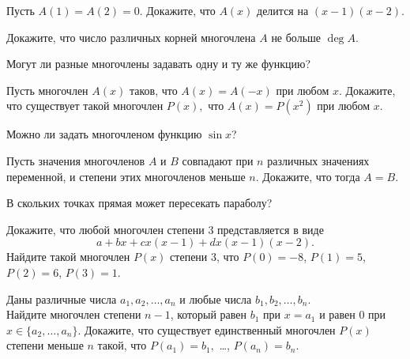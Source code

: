 \documentclass[a4paper, 12pt]{article}
\begin{document}
 Пусть $A(1)=A(2)=0.$  Докажите, что  $A(x)$ делится на $(x-1)(x-2).$

 Докажите, что число различных корней многочлена $A$ не больше
$\deg A.$

Могут ли разные многочлены задавать одну и ту же функцию?

 Пусть многочлен $A(x)$ таков, что $A(x)=A(-x)$ при любом $x$.
Докажите, что  существует такой многочлен $P(x),$ что
$A(x)=P(x^2)$ при любом $x$.


 Можно ли задать многочленом функцию $\sin x$?

 Пусть значения многочленов $A$ и $B$
совпадают при $n$ различных значениях переменной, и степени
этих многочленов меньше $n$. Докажите, что тогда $A=B.$

В скольких точках прямая может пересекать параболу?



  Докажите, что  любой многочлен степени 3
представляется в виде
$$a+bx+cx(x-1)+dx(x-1)(x-2).$$
 Найдите такой многочлен $P(x)$ степени 3,
что $P(0)=-8$, $P(1)=5$, $P(2)=6$, $P(3)=1$.

Даны различные числа $a_1,a_2,\dots ,a_n$ и любые числа $b_1,b_2,\dots ,b_n$.\\
Найдите многочлен степени $n-1$, который равен $b_1$ при $x=a_1$ и равен 0 при $x\in\{a_2,\dots,a_n\}$.
Докажите, что существует единственный многочлен $P(x)$ степени
меньше $n$ такой, что $P(a_1)=b_1,$  \dots , $P(a_n)=b_n.$





\end{document}
